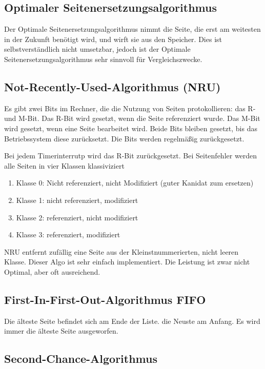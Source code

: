 \subsection{Optimaler Seitenersetzungsalgorithmus}

Der Optimale Seitenersetzungsalgorithmus nimmt die Seite, die erst am weitesten in der Zukunft benötigt wird, und wirft sie aus den Speicher. Dies ist selbstverständlich nicht umsetzbar, jedoch ist der Optimale Seitenersetzungsalgorithmus sehr sinnvoll für Vergleichszwecke.

\subsection{Not-Recently-Used-Algorithmus (NRU)}

Es gibt zwei Bits im Rechner, die die Nutzung von Seiten protokollieren: das R- und M-Bit. Das R-Bit wird gesetzt, wenn die Seite referenziert wurde. Das M-Bit wird gesetzt, wenn eine Seite bearbeitet wird. Beide Bits bleiben gesetzt, bis das Betriebssystem diese zurücksetzt. Die Bits werden regelmäßig zurückgesetzt.

Bei jedem Timerinterrutp wird das R-Bit zurückgesetzt. Bei Seitenfehler werden alle Seiten in vier Klassen klassiviziert

\begin{enumerate}
    \item Klasse 0: Nicht referenziert, nicht Modifiziert (guter Kanidat zum ersetzen)
    \item Klasse 1: nicht referenziert, modifiziert
    \item Klasse 2: referenziert, nicht modifiziert
    \item Klasse 3: referenziert, modifiziert
\end{enumerate}

NRU entfernt zufällig eine Seite aus der Kleinstnummerierten, nicht leeren Klasse. Dieser Algo ist sehr einfach implementiert. Die Leistung ist zwar nicht Optimal, aber oft ausreichend.

\subsection{First-In-First-Out-Algorithmus FIFO}

Die älteste Seite befindet sich am Ende der Liste. die Neuste am Anfang. Es wird immer die älteste Seite ausgeworfen.

\subsection{Second-Chance-Algorithmus}

